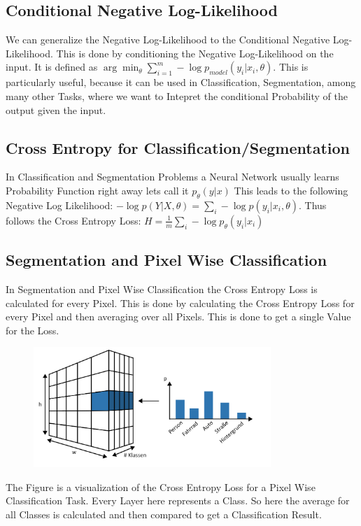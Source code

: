 \documentclass[a4paper]{article}
\begin{document}
\subsection{Conditional Negative Log-Likelihood}
We can generalize the Negative Log-Likelihood to the Conditional Negative Log-Likelihood. This is done by conditioning the Negative Log-Likelihood on the input. It is defined as $\arg \min_{\theta} \sum_{i = 1}^{m} - \log p_{model}(y_{i}|x_{i}, \theta)$. This is particularly useful, because it can be used in Classification, Segmentation, among many other Tasks, where we want to Intepret the conditional Probability of the output given the input.

\subsection{Cross Entropy for Classification/Segmentation}
In Classification and Segmentation Problems a Neural Network usually learns Probability Function right away lets call it $p_{\theta}(y|x)$ This leads to the following Negative Log Likelihood: $- \log p(Y|X,\theta) =  \sum_{i} - \log p(y_{i}|x_{i}, \theta)$.  
Thus follows the Cross Entropy Loss: $H = \frac{1}{m} \sum_{i} - \log p_{\theta}(y_{i}|x_{i})$
\subsection{Segmentation and Pixel Wise Classification}
In Segmentation and Pixel Wise Classification the Cross Entropy Loss is calculated for every Pixel. This is done by calculating the Cross Entropy Loss for every Pixel and then averaging over all Pixels. This is done to get a single Value for the Loss.
\begin{figure}[h]
    \centering
    \includegraphics[width=0.8\textwidth]{images/pixel_wise.png}
    \caption{}
    \label{fig:}
\end{figure}
The Figure is a visualization of the Cross Entropy Loss for a Pixel Wise Classification Task. Every Layer here represents a Class. So here the average for all Classes is calculated and then compared to get a Classification Result. 
\end{document}
